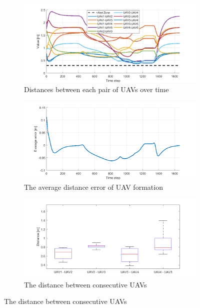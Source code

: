 \begin{figure}[t]
    \centering
    \begin{subfigure}[b]{0.49\textwidth}
    \includegraphics[width=\textwidth]{paper1/images/distance.png}
    \caption{Distances between each pair of UAVs over time}
    \label{fig:chap2_distance}
    \end{subfigure}
    \begin{subfigure}[b]{0.49\textwidth}
    \includegraphics[width=\textwidth]{paper1/images/error.png}
    \caption{The average distance error of UAV formation}
    \label{fig:chap2_error}
    \end{subfigure}
    \begin{subfigure}[b]{0.49\textwidth}
    \includegraphics[width=\textwidth]{paper1/images/mean.png}
    \caption{The distance between consecutive UAVs}

\end{subfigure}
\end{figure}
